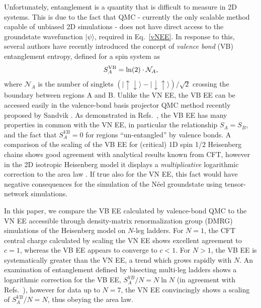 \documentclass[prl,aps,twocolumn,floatfix,amsmath,amssymb,superscriptaddress,tightenlines]{revtex4}
\begin{document}
Unfortunately, entanglement is a quantity that is difficult to
measure in 2D systems.  This is due to the fact that QMC - currently the
only scalable method capable of unbiased 2D simulations - does not have
direct access to the groundstate wavefunction $| \psi \rangle$, required
in Eq.~\eqref{vNEE}.  In response to this, several authors \cite{Alet,
Chh} have recently introduced the concept of {\it valence bond} (VB)
entanglement entropy, defined for a  spin system as
\begin{equation} 
S^{\rm VB}_A = \ln(2) \cdot \mathcal{N}_A, \label{VBEE}
\end{equation} 
where $ \mathcal{N}_A$ is the number of singlets
${( |\uparrow \downarrow \rangle - | \downarrow \uparrow
\rangle)/\sqrt{2}}$ crossing the boundary between regions A and B.  Unlike
the VN EE, the VB EE can be accessed easily in the valence-bond basis
projector QMC method recently proposed by Sandvik \cite{Sandvik}.  As
demonstrated in Refs.~\cite{Alet,Chh}, the VB EE has many properties in
common with the VN EE, in particular the relationship $S_A = S_B$, and the
fact that $S^{VB}_A=0$ for regions ``un-entangled'' by valence bonds.
A comparison of the scaling of the VB EE for (critical) 1D spin
1/2 Heisenberg chains shows good agreement with analytical results known
from CFT, however in the
 2D isotropic Heisenberg model it
displays a {\it multiplicative} logarithmic correction to the area law \cite{Alet,Chh}.  If
true also for the VN EE, this fact would have negative consequences for the simulation of the 
N\'eel groundstate using tensor-network simulations.

 
In this paper, we compare the VB EE calculated by valence-bond QMC to the
VN EE accessible through density-matrix renormalization group
(DMRG) simulations of the Heisenberg model on $N$-leg ladders.    For $N=1$, the CFT central charge calculated  by scaling the
VN EE shows excellent agreement to $c=1$, whereas the VB EE appears to converge
to $c<1$.
For $N>1$, the VB EE is systematically greater than the VN EE,
a trend which grows rapidly with $N$. An
examination of entanglement defined by bisecting multi-leg ladders
shows a logarithmic correction for the VB EE, $S^{VB}_A /N = N \ln
N$ (in agreement with Refs.~\cite{Alet,Chh}), however for data up to
$N=7$, the VN EE convincingly shows a scaling of
$S^{VB}_A /N = N$, thus obeying the area law.
\end{document}
